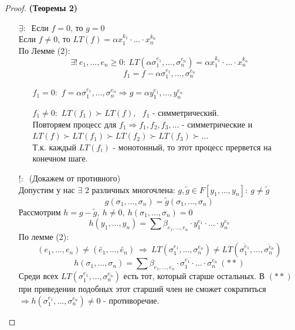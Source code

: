 \documentclass[a4paper, 12pt]{article}
\theoremstyle{definition}
\begin{document}
  \begin{proof} \textbf{(Теоремы 2)} 
    \begin{itemize}
      \item[$\underline{\exists}: \ $] Если $f = 0$, то $g = 0$\\
      Если $f \neq 0$, то $LT(f) = \alpha x_1^{k_1} \cdot ... \cdot x_n^{k_n}$\\
      По Лемме (2): 
      $$\exists ! \ e_1,...,e_n \geq 0: \ LT(\alpha \sigma_1^{e_1},...,\sigma_n^{e_n}) = \alpha x_1^{k_1} \cdot ... \cdot x_n^{k_n}$$
      $$f_1 = f - \alpha \sigma_1^{e_1},...,\sigma_n^{e_n}$$
      \begin{itemize}
        \item[$f_1 = 0:$] $f = \alpha \sigma_1^{e_1},...,\sigma_n^{e_n} \Longrightarrow g = \alpha y_1^{e_1},...,y_n^{e_n}$
        \item[$f_1 \neq 0:$] $LT(f_1) \succ LT(f)$, \ $f_1$ - симметрический.\\
        Повторяем процесс для $f_1 \Longrightarrow f_1,f_2,f_3,...$ - симметрические и\\
        $LT(f) \succ LT(f_1) \succ LT(f_2) \succ LT(f_3) \succ ...$\\
        Т.к. каждый $LT(f_i)$ - монотонный, то этот процесс прервется на конечном шаге.   
      \end{itemize}
      \item[$\underline{!}: \ $] (Докажем от противного)\\
      Допустим у нас $\exists$  2 различных многочлена: $g, \widetilde{g} \in F[y_1,...,y_n]: \ g \neq \widetilde{g}$ 
      $$g(\sigma_1,...,\sigma_n) = \widetilde{g}(\sigma_1,...,\sigma_n)$$
      Рассмотрим $h = g - \widetilde{g}, \ h \neq 0, \ h(\sigma_1,...,\sigma_n) = 0$
      $$h(y_1,...,y_n) = \sum \beta_{e_1,...,e_n} \cdot y_1^{e_1} \cdot ... \cdot y_n^{e_n}$$
      По лемме (2):
      $$(e_1,...,e_n) \neq (\widetilde{e_1},...,\widetilde{e_n})\ \Longrightarrow \ LT(\sigma_1^{e_1},...,\sigma_n^{e_n}) \neq LT(\sigma_1^{\widetilde{e}_1},...,\sigma_n^{\widetilde{e}_n})$$
      $$h(\sigma_1,...,\sigma_n) = \sum \beta_{e_1,...,e_n} \cdot \sigma_1^{e_1} \cdot ... \cdot \sigma_n^{e_n} \ (**)$$
      Среди всех $LT(\sigma_1^{e_1},...,\sigma_n^{e_n})$ есть тот, который старше остальных. В $(**)$ при приведении подобных этот старший член не сможет сократиться $\Longrightarrow h(\sigma_1^{e_1},...,\sigma_n^{e_n}) \neq 0$ - противоречие. 
    \end{itemize}
  \end{proof}
\end{document}
